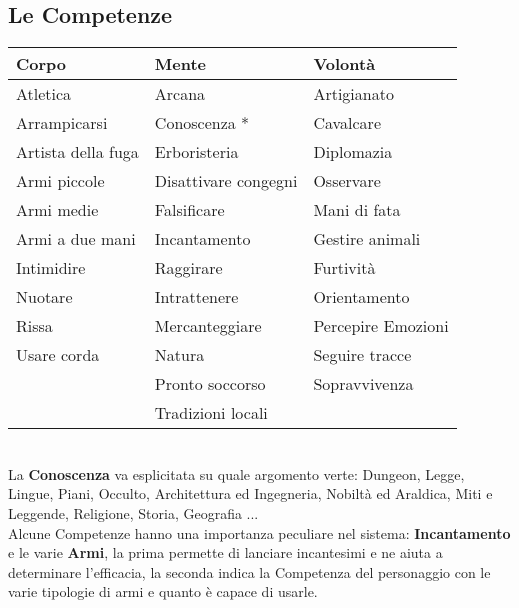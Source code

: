 \documentclass[12pt,a4paper,twoside,openany]{book}
\begin{document}
\subsection{Le Competenze}

\begin{tabular*}{0.93\linewidth}{@{\extracolsep{\fill}}lll}
\textbf{Corpo} & \textbf{Mente} & \textbf{Volontà}\\
\toprule
Atletica				& Arcana					& Artigianato			\\	
Arrampicarsi			& Conoscenza *				& Cavalcare				\\
Artista della fuga		& Erboristeria				& Diplomazia			\\
Armi piccole 			& Disattivare congegni		& Osservare	\\
Armi medie 				& Falsificare				& Mani di fata\\
Armi a due mani			& Incantamento				& Gestire animali\\
Intimidire		 		& Raggirare					& Furtività\\
Nuotare					& Intrattenere				& Orientamento\\
Rissa					& Mercanteggiare			& Percepire Emozioni \\ 
Usare corda		 		& Natura					& Seguire tracce\\
						& Pronto soccorso			& Sopravvivenza\\
						& Tradizioni locali			& \\

\end{tabular*}\\

La \textbf{Conoscenza} va esplicitata su quale argomento verte: Dungeon, Legge, Lingue, Piani, Occulto, Architettura ed Ingegneria, Nobiltà ed Araldica, Miti e Leggende, Religione, Storia, Geografia ...\\

Alcune Competenze hanno una importanza peculiare nel sistema: \textbf{Incantamento} e le varie \textbf{Armi}, la prima permette di lanciare incantesimi e ne aiuta a determinare l'efficacia, la seconda indica la Competenza del personaggio con le varie tipologie di armi e quanto è capace di usarle.
\end{document}
